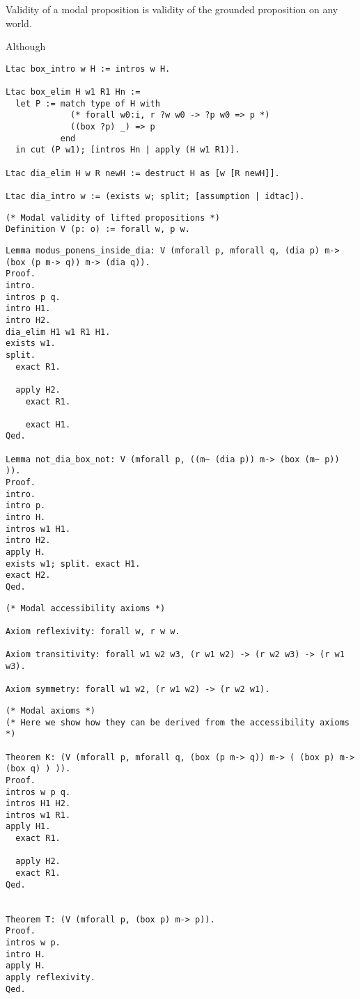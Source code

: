 \documentclass{llncs}
\begin{document}
\noindent
Validity of a modal proposition is validity of the grounded proposition on any world.


\noindent
Although 


\begin{verbatim}
Ltac box_intro w H := intros w H.

Ltac box_elim H w1 R1 Hn := 
  let P := match type of H with
             (* forall w0:i, r ?w w0 -> ?p w0 => p *)
             ((box ?p) _) => p
           end
  in cut (P w1); [intros Hn | apply (H w1 R1)].

Ltac dia_elim H w R newH := destruct H as [w [R newH]].

Ltac dia_intro w := (exists w; split; [assumption | idtac]).
\end{verbatim}

\begin{verbatim}
(* Modal validity of lifted propositions *)
Definition V (p: o) := forall w, p w.
\end{verbatim}


\begin{verbatim}
Lemma modus_ponens_inside_dia: V (mforall p, mforall q, (dia p) m-> (box (p m-> q)) m-> (dia q)).
Proof.
intro.
intros p q.
intro H1.
intro H2.
dia_elim H1 w1 R1 H1.
exists w1.
split.
  exact R1.

  apply H2. 
    exact R1.

    exact H1.
Qed.

Lemma not_dia_box_not: V (mforall p, ((m~ (dia p)) m-> (box (m~ p)) )).
Proof.
intro.
intro p.
intro H.
intros w1 H1.
intro H2.
apply H.
exists w1; split. exact H1.
exact H2.
Qed.
\end{verbatim}

\begin{verbatim}
(* Modal accessibility axioms *)

Axiom reflexivity: forall w, r w w.

Axiom transitivity: forall w1 w2 w3, (r w1 w2) -> (r w2 w3) -> (r w1 w3).

Axiom symmetry: forall w1 w2, (r w1 w2) -> (r w2 w1).
\end{verbatim}

\begin{verbatim}
(* Modal axioms *)
(* Here we show how they can be derived from the accessibility axioms *)

Theorem K: (V (mforall p, mforall q, (box (p m-> q)) m-> ( (box p) m-> (box q) ) )).
Proof.
intros w p q.
intros H1 H2.
intros w1 R1.
apply H1.
  exact R1.

  apply H2.
  exact R1.
Qed.


Theorem T: (V (mforall p, (box p) m-> p)).
Proof.
intros w p.
intro H.
apply H.
apply reflexivity.
Qed.  
\end{verbatim}
\end{document}
